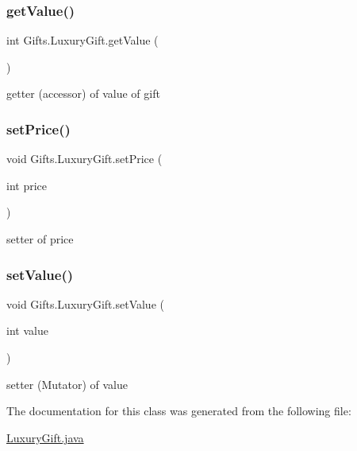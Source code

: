 \subsubsection{\texorpdfstring{get\+Value()}{getValue()}}
{\footnotesize\ttfamily int Gifts.\+Luxury\+Gift.\+get\+Value (\begin{DoxyParamCaption}{ }\end{DoxyParamCaption})\hspace{0.3cm}{\ttfamily [inline]}}

getter (accessor) of value of gift \mbox{\label{class_gifts_1_1_luxury_gift_aee295d3da2f8a2f38a958cc20ea50ab4}} 
\subsubsection{\texorpdfstring{set\+Price()}{setPrice()}}
{\footnotesize\ttfamily void Gifts.\+Luxury\+Gift.\+set\+Price (\begin{DoxyParamCaption}\item[{int}]{price }\end{DoxyParamCaption})\hspace{0.3cm}{\ttfamily [inline]}}

setter of price \mbox{\label{class_gifts_1_1_luxury_gift_accae65e1f413331ff5747aedeee70792}} 
\subsubsection{\texorpdfstring{set\+Value()}{setValue()}}
{\footnotesize\ttfamily void Gifts.\+Luxury\+Gift.\+set\+Value (\begin{DoxyParamCaption}\item[{int}]{value }\end{DoxyParamCaption})\hspace{0.3cm}{\ttfamily [inline]}}

setter (Mutator) of value 

The documentation for this class was generated from the following file\+:\begin{DoxyCompactItemize}
\item 
\hyperlink{_luxury_gift_8java}{Luxury\+Gift.\+java}\end{DoxyCompactItemize}
